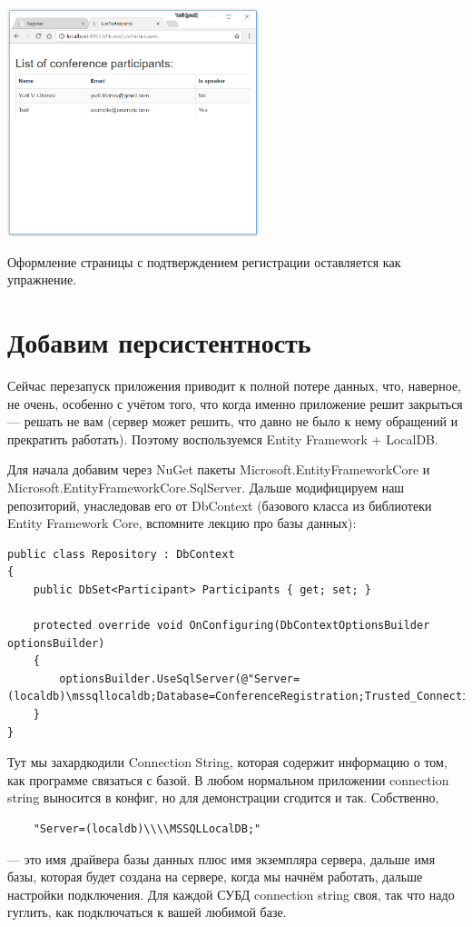 \documentclass[a5paper]{article}
\begin{document}
\begin{center}
    \includegraphics[width=0.55\textwidth]{styledListParticipants.png}
\end{center}

Оформление страницы с подтверждением регистрации оставляется как упражнение.

\section{Добавим персистентность}

Сейчас перезапуск приложения приводит к полной потере данных, что, наверное, не очень, особенно с учётом того, что когда именно приложение решит закрыться --- решать не вам (сервер может решить, что давно не было к нему обращений и прекратить работать). Поэтому воспользуемся
Entity Framework + LocalDB.

Для начала добавим через NuGet пакеты Microsoft.EntityFrameworkCore и Microsoft.EntityFrameworkCore.SqlServer. Дальше модифицируем наш репозиторий, унаследовав его от DbContext (базового класса из библиотеки Entity Framework Core, вспомните лекцию про базы данных):

\begin{scriptsize}
    \begin{verbatim}
public class Repository : DbContext
{
    public DbSet<Participant> Participants { get; set; }

    protected override void OnConfiguring(DbContextOptionsBuilder optionsBuilder)
    {
        optionsBuilder.UseSqlServer(@"Server=(localdb)\mssqllocaldb;Database=ConferenceRegistration;Trusted_Connection=True;");
    }
}
    \end{verbatim}
\end{scriptsize}

Тут мы захардкодили Connection String, которая содержит информацию о том, как программе связаться с базой. В любом нормальном приложении connection string выносится в конфиг, но для демонстрации сгодится и так. Собственно, 
\begin{verbatim}
    "Server=(localdb)\\\\MSSQLLocalDB;"
\end{verbatim} 
--- это имя драйвера базы данных плюс имя экземпляра сервера, дальше имя базы, которая будет создана на сервере, когда мы начнём работать, дальше настройки подключения. Для каждой СУБД connection string своя, так что надо гуглить, как подключаться к вашей любимой базе.
\end{document}
